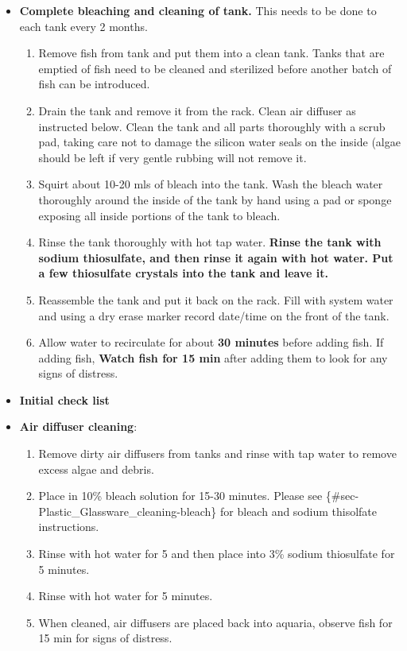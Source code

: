 \documentclass[
  letterpaper,
  DIV=11,
  numbers=noendperiod]{scrreprt}
\providecommand{\tightlist}{%
  \setlength{\itemsep}{0pt}\setlength{\parskip}{0pt}}\usepackage{longtable,booktabs,array}
\begin{document}
\begin{itemize}
\item
  \textbf{Complete bleaching and cleaning of tank.} This needs to be
  done to each tank every 2 months.

  \begin{enumerate}
  \def\labelenumi{\arabic{enumi}.}
  \tightlist
  \item
    Remove fish from tank and put them into a clean tank. Tanks that are
    emptied of fish need to be cleaned and sterilized before another
    batch of fish can be introduced.
  \item
    Drain the tank and remove it from the rack. Clean air diffuser as
    instructed below. Clean the tank and all parts thoroughly with a
    scrub pad, taking care not to damage the silicon water seals on the
    inside (algae should be left if very gentle rubbing will not remove
    it.
  \item
    Squirt about 10-20 mls of bleach into the tank. Wash the bleach
    water thoroughly around the inside of the tank by hand using a pad
    or sponge exposing all inside portions of the tank to bleach.
  \item
    Rinse the tank thoroughly with hot tap water. \textbf{Rinse the tank
    with sodium thiosulfate, and then rinse it again with hot water. Put
    a few thiosulfate crystals into the tank and leave it.}
  \item
    Reassemble the tank and put it back on the rack. Fill with system
    water and using a dry erase marker record date/time on the front of
    the tank.
  \item
    Allow water to recirculate for about \textbf{30 minutes} before
    adding fish. If adding fish, \textbf{Watch fish for 15 min} after
    adding them to look for any signs of distress.
  \end{enumerate}
\item
  \textbf{Initial check list}
\item
  \textbf{Air diffuser cleaning}:

  \begin{enumerate}
  \def\labelenumi{\arabic{enumi}.}
  \tightlist
  \item
    Remove dirty air diffusers from tanks and rinse with tap water to
    remove excess algae and debris.
  \item
    Place in 10\% bleach solution for 15-30 minutes. Please see
    \{\#sec-Plastic\_Glassware\_cleaning-bleach\} for bleach and sodium
    thisolfate instructions.
  \item
    Rinse with hot water for 5 and then place into 3\% sodium
    thiosulfate for 5 minutes.
  \item
    Rinse with hot water for 5 minutes.
  \item
    When cleaned, air diffusers are placed back into aquaria, observe
    fish for 15 min for signs of distress.
  \end{enumerate}
\end{itemize}
\end{document}
